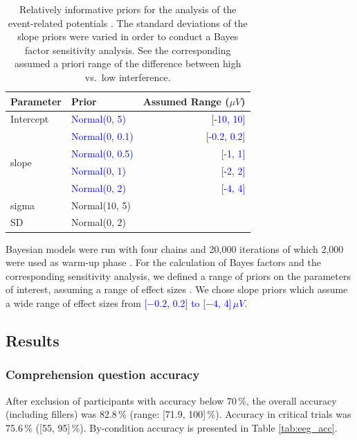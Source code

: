 \documentclass[a4paper, man, floatsintext]{apa7}
\begin{document}
\begin{table}[!htbp]
    \caption{Relatively informative priors for the analysis of the event-related potentials \citep{nicenboim_stats}. The standard deviations of the slope priors were varied in order to conduct a Bayes factor sensitivity analysis. See the corresponding assumed a priori range of the difference between high vs.\ low interference.}
    \label{tab:eeg_priors}
    \centering
    \begin{tabular}{llr}
    \toprule
    Parameter&Prior &Assumed Range ($\mu V$)\\
    \midrule
  Intercept & \textcolor{blue}{Normal(0, 5)}& \textcolor{blue}{[-10, 10]}\\
  \cmidrule{2-3}
  \multirow{4}{1cm}{slope} & \textcolor{blue}{Normal(0, 0.1)} & \textcolor{blue}{[-0.2, 0.2}]\\
  & \textcolor{blue}{Normal(0, 0.5)}& \textcolor{blue}{[-1, 1]}\\
  & \textcolor{blue}{Normal(0, 1)} & \textcolor{blue}{[-2, 2]}\\
  & \textcolor{blue}{Normal(0, 2)} & \textcolor{blue}{[-4, 4]}\\
  \cmidrule{2-3}
  sigma & Normal(10, 5)&\\
  SD & Normal(0, 2)&\\
    \bottomrule
    \end{tabular}
\end{table}

Bayesian models were run with four chains and 20,000 iterations of which 2,000 were used as warm-up phase \citep{schad_etal_2022_BF}. For the calculation of Bayes factors and the corresponding sensitivity analysis, we defined a range of priors on the parameters of interest, assuming a range of effect sizes \citep{nicenboim_stats,schad_etal_2022_BF}. We chose slope priors which assume a wide range of effect sizes from \textcolor{blue}{[$-0.2$, 0.2] to [$-4$, 4]\,$\mu V$}. 

\subsection{Results}
\subsubsection{Comprehension question accuracy}
After exclusion of participants with accuracy below 70\,\%, the overall accuracy (including fillers) was 82.8\,\% (range: [71.9, 100]\,\%). Accuracy in critical trials was 75.6\,\% ([55, 95]\,\%). By-condition accuracy is presented in Table \ref{tab:eeg_acc}. 
\end{document}
